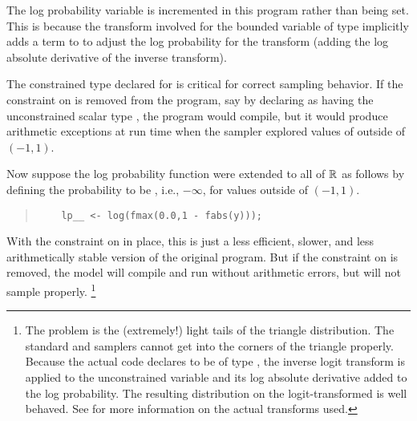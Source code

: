 The log probability variable  is incremented in this
program rather than being set.  This is because the transform involved
for the bounded variable  of type  implicitly
adds a term to  to adjust the log probability for the
transform (adding the log absolute derivative of the inverse
transform).

The constrained type  declared for  is
critical for correct sampling behavior.  If the constraint on 
is removed from the program, say by declaring  as having the
unconstrained scalar type , the program would compile, but
it would produce arithmetic exceptions at run time when the sampler
explored values of  outside of $(-1,1)$.

Now suppose the log probability function were extended to all of
$\mathbb{R}$ as follows by defining the probability to be ,
i.e., $-\infty$, for values outside of $(-1,1)$.
%
\begin{quote}
\begin{Verbatim}
    lp__ <- log(fmax(0.0,1 - fabs(y)));
\end{Verbatim}
\end{quote}
%
With the constraint on  in place, this is just a less
efficient, slower, and less arithmetically stable version of the
original program.  But if the constraint on  is removed, 
the model will compile and run without arithmetic errors, but will not
sample properly.%
%
\footnote{The problem is the (extremely!) light tails of the triangle
  distribution.  The standard \HMC and \NUTS samplers cannot get into the
  corners of the triangle properly.  Because the actual code declares
   to be of type , the inverse logit
  transform is applied to the unconstrained variable and its log
  absolute derivative added to the log probability.  The resulting
  distribution on the logit-transformed  is well behaved.  See
   for more information on the actual
  transforms used.}


